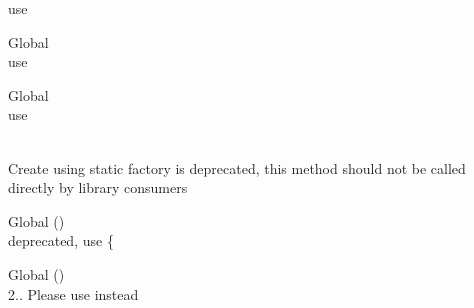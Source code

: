 \begin{DoxyRefList}
\label{deprecated__deprecated000226}%
%
use   
\item[Global \doxylink{class_nette_1_1_schema_1_1_message_a13fb0ef5e93496da8eefffeea6c9fbae}{Message\+::UNEXPECTED\+\_\+\+ITEM} ]\hfill \\
\label{deprecated__deprecated000232}%
%
use   
\item[Global \doxylink{class_nette_1_1_schema_1_1_message_a4dc0b0fe3d7d0a08d381f2fdfb474b55}{Message\+::VALUE\+\_\+\+OUT\+\_\+\+OF\+\_\+\+RANGE} ]\hfill \\
\label{deprecated__deprecated000227}%
%
use   
\item[Global \doxylink{classphp_documentor_1_1_reflection_1_1_doc_block_1_1_tags_1_1_method_a698b22d43114cd3d0a208d8c1c269da0}{Method\+::create} (string \$body, ?\doxylink{classphp_documentor_1_1_reflection_1_1_type_resolver}{Type\+Resolver} \$type\+Resolver=null, ?\doxylink{classphp_documentor_1_1_reflection_1_1_doc_block_1_1_description_factory}{Description\+Factory} \$description\+Factory=null, ?Type\+Context \$context=null)]\hfill \\
\label{deprecated__deprecated000276}%
%
Create using static factory is deprecated, this method should not be called directly by library consumers  
\item[Global \doxylink{classphp_documentor_1_1_reflection_1_1_doc_block_1_1_tags_1_1_method_a1d4c324c5a088be98d99d3efbf3502e1}{Method\+::get\+Arguments} ()]\hfill \\
\label{deprecated__deprecated000277}%
%
 deprecated, use \{ 
\item[Global \doxylink{class_mockery_1_1_mock_accfe7d54e5fc5c8de26f7c5c24f2d4ba}{Mock\+::should\+Defer\+Missing} ()]\hfill \\
\label{deprecated__deprecated000172}%
%
2.. Please use  instead 

\end{DoxyRefList}
